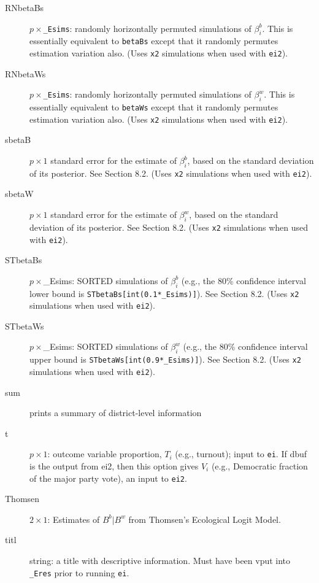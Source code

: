\documentclass[11pt,titlepage]{article}
\begin{document}
\begin{description}
\item[RNbetaBs] $p\times$\texttt{\_Esims}: randomly horizontally
  permuted simulations of $\beta_i^b$.  This is essentially equivalent
  to \texttt{betaBs} except that it randomly permutes estimation
  variation also.  (Uses \texttt{x2} simulations when used with
  \texttt{ei2}).

\item[RNbetaWs] $p\times$\texttt{\_Esims}: randomly horizontally
  permuted simulations of $\beta_i^w$.  This is essentially equivalent
  to \texttt{betaWs} except that it randomly permutes estimation
  variation also.  (Uses \texttt{x2} simulations when used with
  \texttt{ei2}).

\item[sbetaB] $p\times 1$ standard error for the estimate of
  $\beta_i^b$, based on the standard deviation of its posterior.  See
  Section 8.2.  (Uses \texttt{x2} simulations when used
  with \texttt{ei2}).

\item[sbetaW] $p\times 1$ standard error for the estimate of
  $\beta_i^w$, based on the standard deviation of its posterior.  See
  Section 8.2.  (Uses \texttt{x2} simulations when used
  with \texttt{ei2}).

\item[STbetaBs] $p\times$\_Esims: SORTED simulations of $\beta_i^b$
  (e.g., the 80\% confidence interval lower bound is
  \texttt{STbetaBs[int(0.1*\_Esims)]}).  See Section 8.2.
  (Uses \texttt{x2} simulations when used with \texttt{ei2}).

\item[STbetaWs] $p\times$\_Esims: SORTED simulations of $\beta_i^w$
  (e.g., the 80\% confidence interval upper bound is
  \texttt{STbetaWs[int(0.9*\_Esims)]}).  See Section 8.2.
  (Uses \texttt{x2} simulations when used with \texttt{ei2}).

\item[sum] prints a summary of district-level information

\item[t] $p\times 1$: outcome variable proportion, $T_i$ (e.g.,
  turnout); input to \texttt{ei}.  If dbuf is the output from ei2,
  then this option gives $V_i$ (e.g., Democratic fraction of the major
  party vote), an input to \texttt{ei2}.

\item[Thomsen] $2\times 1$: Estimates of $B^b|B^w$ from Thomsen's
  Ecological Logit Model.

\item[titl] string: a title with descriptive information. Must have
  been vput into \texttt{\_Eres} prior to running \texttt{ei}.


\end{description}
\end{document}
